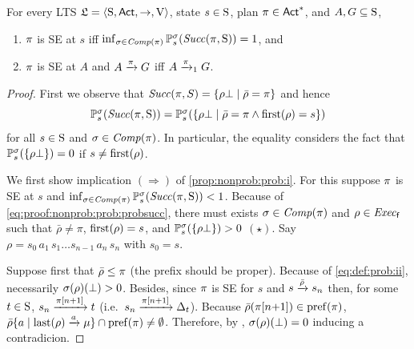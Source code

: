 \begin{proposition}\label{prop:nonprob:prob}
  For every LTS $\model=\tup{\S,\Act,\ra,\V}$, state $s\in\S$, plan
  $\plan\in\Act^*$, and $A,G\subseteq\S$,
  \begin{enumerate}
  \item\label{prop:nonprob:prob:i}%
    $\plan$ is SE at $s$ iff
    $\inf_{\strat\in\Comp(\plan)}\Prob^\strat_s(\Succ(\plan,\S))=1$,
    and
  \item\label{prop:nonprob:prob:ii}%
    $\plan$ is SE at $A$ and $A \reach{\plan} G$ iff $A \reach{\plan}_1 G$.
  \end{enumerate}
\end{proposition}
%
%
%
\begin{proof}
  First we observe that
  $\Succ(\plan,S) = \{{\rho\complete}\mid{\bar{\rho}=\plan}\}$
  and hence
  \begin{equation}\label{eq:proof:nonprob:prob:probsucc}
    \textstyle
    \Prob^\strat_s(\Succ(\plan,\S)) =
    \Prob^\strat_s(\{{\rho\complete}\mid{\bar{\rho}=\plan}\wedge{\first(\rho)=s}\})
  \end{equation}
  for all $s\in\S$ and $\strat\in\Comp(\plan)$. In particular, the
  equality considers the fact that
  $\Prob^\strat_s(\{\rho\complete\})=0$ if $s\neq\first(\rho)$.

  We first show implication $(\Rightarrow)$ of
  \cref{prop:nonprob:prob:i}.
  For this suppose $\plan$ is SE at $s$ and
  $\inf_{\strat\in\Comp(\plan)}\Prob^\strat_s(\Succ(\plan,\S))<1$.
  Because of \cref{eq:proof:nonprob:prob:probsucc}, there must exists
  $\strat\in\Comp(\plan)$ and $\rho\in\execf$ such that
  $\bar{\rho}\neq\pi$, $\first(\rho)=s$, and
  $\Prob^\strat_s(\{\rho\complete\})>0$ $(\star)$.
  Say $\rho=s_0\, a_1\, s_1\ldots s_{n-1}\, a_n\, s_n$ with $s_0=s$.

  Suppose first that $\bar{\rho}\leq\plan$ (the prefix should be
  proper).  Because of \cref{eq:def:prob:ii}, necessarily
  $\strat(\rho)(\complete) > 0$.  Besides, since $\plan$ is SE for $s$
  and $s\reach{\bar{\rho}}s_n$ then, for some $t\in\S$,
  $s_n\reach{\plan[n{+}1]}t$ (i.e.\ $s_n\reach{\plan[n{+}1]}\Dirac_t$).
  Because $\bar{\rho}(\plan[n{+}1])\in\pref(\plan)$,
  $\bar{\rho}\{a\mid{\last(\rho)\reach{a}\mu}\}\cap\pref(\plan)\neq\emptyset$.
  Therefore, by , $\strat(\rho)(\complete) = 0$
  inducing a contradicion.


\end{proof}

